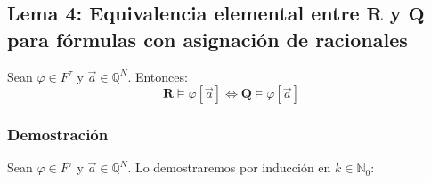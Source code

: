 \documentclass{article}
\begin{document}
\subsection*{Lema 4: Equivalencia elemental entre $\mathbf{R}$ y $\mathbf{Q}$ para fórmulas con asignación de racionales}
Sean $\varphi\in F^\tau$ y $\vec{a}\in\mathbb{Q}^N$. Entonces:
\begin{equation*}
  \mathbf{R}\vDash\varphi[\vec{a}]\iff\mathbf{Q}\vDash\varphi[\vec{a}]
\end{equation*}

\subsubsection*{Demostración}
Sean $\varphi\in F^\tau$ y $\vec{a}\in\mathbb{Q}^N$.
Lo demostraremos por inducción en $k\in\mathbb{N}_0$:
\end{document}
